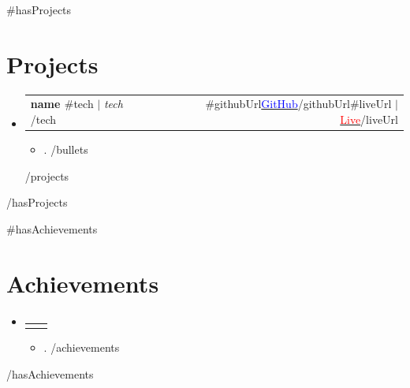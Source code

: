\documentclass[letterpaper,10pt]{article}
\makeatletter
\newcommand{\resumeItem}[1]{\item\small{{#1 \vspace{-2pt}}}}
\newcommand{\resumeProjectHeading}[2]{
    \item
    \begin{tabular*}{0.97\textwidth}{l@{\extracolsep{\fill}}r}
      \small#1 & #2 \\
    \end{tabular*}\vspace{-7pt}
}
\newcommand{\resumeSubHeadingListStart}{\begin{itemize}[leftmargin=0.15in, label={}]}
\newcommand{\resumeSubHeadingListEnd}{\end{itemize}}
\newcommand{\resumeItemListStart}{\begin{itemize}}
\newcommand{\resumeItemListEnd}{\end{itemize}\vspace{-5pt}}
\makeatother
\begin{document}
{{#hasProjects}}
\section{Projects}
  \resumeSubHeadingListStart
{{#projects}}
    \resumeProjectHeading
      {\textbf{ {{ name }} }{{#tech}} $|$ \emph{ {{ tech }} }{{/tech}}}{ {{#githubUrl}}\href{ {{{ githubUrl }}} }{\textcolor{blue}{GitHub}}{{/githubUrl}}{{#liveUrl}} $|$ \href{ {{{ liveUrl }}} }{\textcolor{red}{Live}}{{/liveUrl}} }
      \resumeItemListStart
{{#bullets}}        \resumeItem{ {{ . }} }
{{/bullets}}      \resumeItemListEnd
{{/projects}}
  \resumeSubHeadingListEnd
{{/hasProjects}}

{{#hasAchievements}}
\section{Achievements}
\vspace{-13pt}
  \resumeSubHeadingListStart
    \resumeProjectHeading
      {}{}
      \resumeItemListStart
{{#achievements}}        \resumeItem{ {{ . }} }
{{/achievements}}      \resumeItemListEnd
  \resumeSubHeadingListEnd
{{/hasAchievements}}
\end{document}
